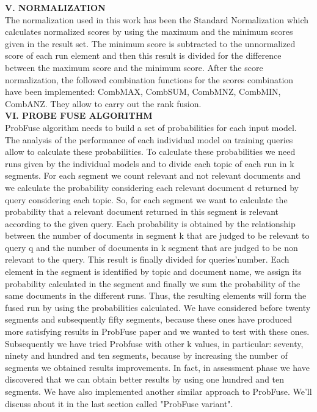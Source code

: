 \documentclass[12pt,journal]{IEEEtran}
\begin{document}
\textbf{V. NORMALIZATION} \\
The normalization used in this work has been the Standard Normalization which calculates normalized scores by using the maximum and the minimum scores given in the result set. 
The minimum score is subtracted to the unnormalized score of each run element and then this result is divided for the difference between the maximum score and the minimum score.
After the score normalization, the followed combination functions for the scores combination have been implemented: CombMAX, CombSUM, CombMNZ, CombMIN, CombANZ.
They allow to carry out the rank fusion. \\

\textbf{VI.	PROBE FUSE ALGORITHM} \\
ProbFuse algorithm needs to build a set of probabilities for each input model. 
The analysis of the performance of each individual model on training queries allow to calculate these probabilities. 
To calculate these probabilities we need runs given by the individual models and to divide each topic of each run in k segments. For each segment we count relevant and not relevant documents and we calculate the probability considering each relevant document d returned by query considering each topic. 
So, for each segment we want to calculate the probability that a relevant document returned in this segment is relevant according to the given query. Each probability is obtained by the relationship between the number of documents in segment k that are judged to be relevant to query q and the number of documents in k segment that are judged to be non relevant to the query. This result is finally divided for queries'number.
Each element in the segment is identified by topic and document name, we assign its probability calculated in the segment and finally we sum the probability of the same documents in the different runs.
Thus, the resulting elements will form the fused run by using the probabilities calculated. 
We have considered before twenty segments and subsequently fifty segments, because these ones have produced more satisfying results in ProbFuse paper and we wanted to test with these ones. Subsequently we have tried Probfuse with other k values, in particular: seventy, ninety and hundred and ten segments, because by increasing the number of segments we obtained results improvements. In fact, in assessment phase we have discovered that we can obtain better results by using one hundred and ten segments. We have also implemented another similar approach to ProbFuse. We'll discuss about it in the last section called "ProbFuse variant". \\
\end{document}
